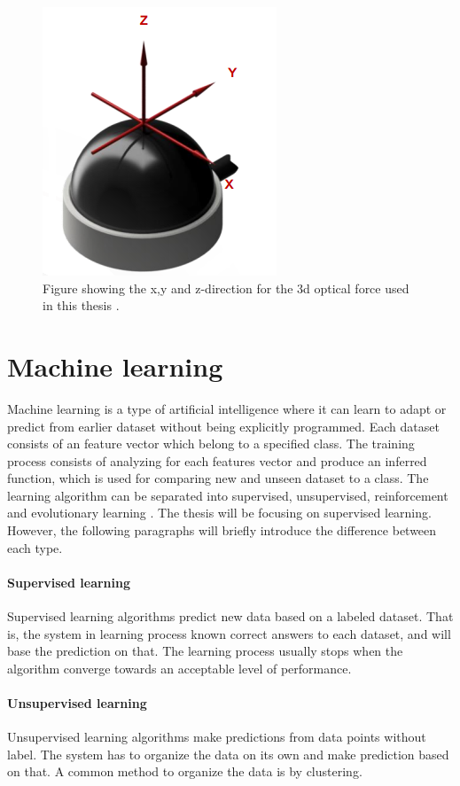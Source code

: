 \documentclass[USenglish]{ifimaster}  %
\begin{document}
	
\begin{figure}[h]
	\centering
	\includegraphics[scale=0.8]{Figures/OptoforceAxis3}
	\caption{Figure showing the x,y and z-direction for the 3d optical force used in this thesis \cite{OptoforceSheet}.}
	\label{fig:OptoforceAxis}
\end{figure}
	
\section {Machine learning}
Machine learning is a type of artificial intelligence where it can learn to adapt or predict from earlier dataset without being explicitly programmed. Each dataset consists of an feature vector which belong to a specified class. The training process consists of analyzing for each features vector and produce an inferred function, which is used for comparing new and unseen dataset to a class. The learning algorithm can be separated into supervised, unsupervised, reinforcement and evolutionary learning \cite{Marsland:2009:MLA:1571643}. The thesis will be focusing on supervised learning. However, the following paragraphs will briefly introduce the difference between each type.
	
\paragraph{Supervised learning}
Supervised learning algorithms predict new data based on a labeled dataset. That is, the system in learning process known correct answers to each dataset, and will base the prediction on that. The learning process usually stops when the algorithm converge towards an acceptable level of performance.
	
\paragraph{Unsupervised learning}
Unsupervised learning algorithms make predictions from data points without label. The system has to organize the data on its own and make prediction based on that. A common method to organize the data is by clustering.
	
\end{document}
